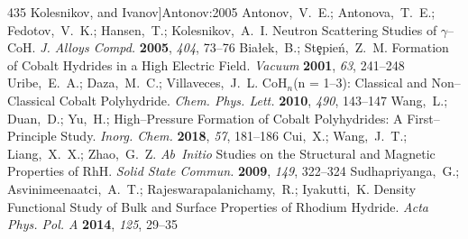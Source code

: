 \documentclass[12pt,letterpaper,oneside]{article}
\begin{document}
\begin{mcitethebibliography}{435}
  Kolesnikov, and Ivanov]{Antonov:2005}
Antonov,~V.~E.; Antonova,~T.~E.; Fedotov,~V.~K.; Hansen,~T.; Kolesnikov,~A.~I.
    Neutron Scattering Studies of $\gamma$--CoH. \emph{J. Alloys
  Compd.} \textbf{2005}, \emph{404}, 73--76\relax
\mciteBstWouldAddEndPuncttrue
\mciteSetBstMidEndSepPunct{\mcitedefaultmidpunct}
{\mcitedefaultendpunct}{\mcitedefaultseppunct}\relax
\EndOfBibitem
{}
Bia{\l}ek,~B.; St{\c e}pie{\'n},~Z.~M. Formation of Cobalt Hydrides in a High
  Electric Field. \emph{Vacuum} \textbf{2001}, \emph{63}, 241--248\relax
\mciteBstWouldAddEndPuncttrue
\mciteSetBstMidEndSepPunct{\mcitedefaultmidpunct}
{\mcitedefaultendpunct}{\mcitedefaultseppunct}\relax
\EndOfBibitem
{}
Uribe,~E.~A.; Daza,~M.~C.; Villaveces,~J.~L. CoH$_n$(n = 1--3): Classical and
  Non--Classical Cobalt Polyhydride. \emph{Chem. Phys. Lett.} \textbf{2010},
  \emph{490}, 143--147\relax
\mciteBstWouldAddEndPuncttrue
\mciteSetBstMidEndSepPunct{\mcitedefaultmidpunct}
{\mcitedefaultendpunct}{\mcitedefaultseppunct}\relax
\EndOfBibitem
{}
Wang,~L.; Duan,~D.; Yu,~H.;   High--Pressure
  Formation of Cobalt Polyhydrides: A First--Principle Study. \emph{Inorg.
  Chem.} \textbf{2018}, \emph{57}, 181--186\relax
\mciteBstWouldAddEndPuncttrue
\mciteSetBstMidEndSepPunct{\mcitedefaultmidpunct}
{\mcitedefaultendpunct}{\mcitedefaultseppunct}\relax
\EndOfBibitem
{}
Cui,~X.; Wang,~J.~T.; Liang,~X.~X.; Zhao,~G.~Z. \emph{Ab~Initio} Studies on the
  Structural and Magnetic Properties of RhH. \emph{Solid State Commun.}
  \textbf{2009}, \emph{149}, 322--324\relax
\mciteBstWouldAddEndPuncttrue
\mciteSetBstMidEndSepPunct{\mcitedefaultmidpunct}
{\mcitedefaultendpunct}{\mcitedefaultseppunct}\relax
\EndOfBibitem
{}
Sudhapriyanga,~G.; Asvinimeenaatci,~A.~T.; Rajeswarapalanichamy,~R.;
  Iyakutti,~K. Density Functional Study of Bulk and Surface Properties of
  Rhodium Hydride. \emph{Acta Phys. Pol. A} \textbf{2014}, \emph{125},
  29--35\relax
\mciteBstWouldAddEndPuncttrue
\mciteSetBstMidEndSepPunct{\mcitedefaultmidpunct}
{\mcitedefaultendpunct}{\mcitedefaultseppunct}\relax
\EndOfBibitem
{}

\end{mcitethebibliography}
\end{document}
